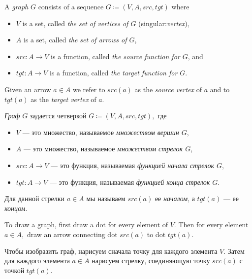 \documentclass[../main/CT4S-EN-RU]{subfiles}
\begin{document}
\begin{definitionENG}\label{def:graph}
A {\em graph} $G$ consists of a sequence $G{\coloneqq}(V,A,src,tgt)$ where 
\begin{itemize}
\item $V$ is a set, called {\em the set of vertices of $G$} (singular:{\em vertex}),
\item $A$ is a set, called {\em the set of arrows of $G$},
\item $src\colon A{→} V$ is a function, called {\em the source function for $G$}, and
\item $tgt\colon A{→} V$ is a function, called {\em the target function for $G$}.
\end{itemize}
Given an arrow $a\in A$ we refer to $src(a)$ as the {\em source vertex} of $a$ and to $tgt(a)$ as the {\em target vertex} of $a.$
\end{definitionENG}

\begin{definitionRUS}\label{def:graph}
{\em Граф} $G$ задается четверкой $G{\coloneqq}(V,A,src,tgt),$ где
\begin{itemize}
\item $V$ — это множество, называемое {\em множеством вершин $G$},
\item $A$ — это множество, называемое {\em множеством стрелок $G$},
\item $src\colon A{→} V$ — это функция, называемая {\em функцией начала стрелок $G$},
\item $tgt\colon A{→} V$ — это функция, называемая {\em функцией конца стрелок $G$}.
\end{itemize}
Для данной стрелки $a\in A$ мы называем $src(a)$ ее {\em началом}, а $tgt(a)$ — ее {\em концом}.
\end{definitionRUS}

\begin{blockENG}
To draw a graph, first draw a dot for every element of $V.$ Then for every element $a\in A,$ draw an arrow connecting dot $src(a)$ to dot $tgt(a).$
\end{blockENG}

\begin{blockRUS}
Чтобы изобразить граф, нарисуем сначала точку для каждого элемента $V.$ Затем для каждого элемента $a\in A$ нарисуем стрелку, соединяющую точку $src(a)$ с точкой $tgt(a).$
\end{blockRUS}
\end{document}
